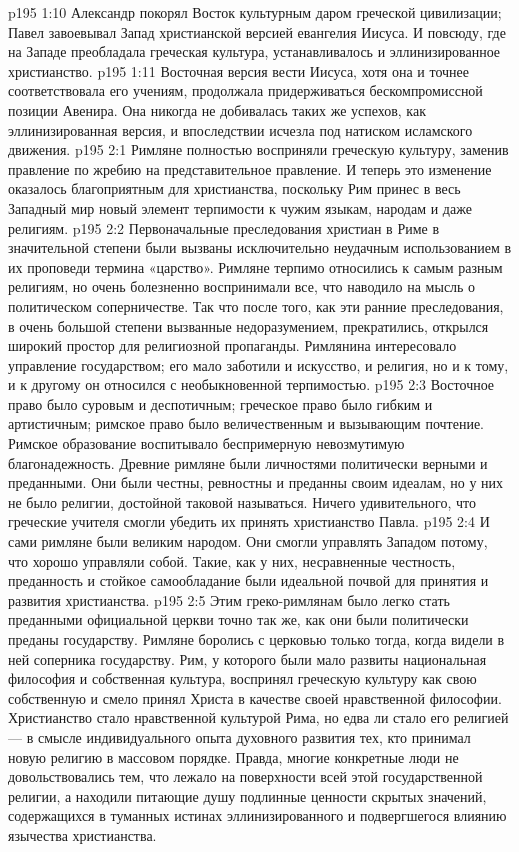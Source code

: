 \vs p195 1:10 Александр покорял Восток культурным даром греческой цивилизации; Павел завоевывал Запад христианской версией евангелия Иисуса. И повсюду, где на Западе преобладала греческая культура, устанавливалось и эллинизированное христианство.
\vs p195 1:11 \pc Восточная версия вести Иисуса, хотя она и точнее соответствовала его учениям, продолжала придерживаться бескомпромиссной позиции Авенира. Она никогда не добивалась таких же успехов, как эллинизированная версия, и впоследствии исчезла под натиском исламского движения.
\vs p195 2:1 Римляне полностью восприняли греческую культуру, заменив правление по жребию на представительное правление. И теперь это изменение оказалось благоприятным для христианства, поскольку Рим принес в весь Западный мир новый элемент терпимости к чужим языкам, народам и даже религиям.
\vs p195 2:2 Первоначальные преследования христиан в Риме в значительной степени были вызваны исключительно неудачным использованием в их проповеди термина «царство». Римляне терпимо относились к самым разным религиям, но очень болезненно воспринимали все, что наводило на мысль о политическом соперничестве. Так что после того, как эти ранние преследования, в очень большой степени вызванные недоразумением, прекратились, открылся широкий простор для религиозной пропаганды. Римлянина интересовало управление государством; его мало заботили и искусство, и религия, но и к тому, и к другому он относился с необыкновенной терпимостью.
\vs p195 2:3 Восточное право было суровым и деспотичным; греческое право было гибким и артистичным; римское право было величественным и вызывающим почтение. Римское образование воспитывало беспримерную невозмутимую благонадежность. Древние римляне были личностями политически верными и преданными. Они были честны, ревностны и преданны своим идеалам, но у них не было религии, достойной таковой называться. Ничего удивительного, что греческие учителя смогли убедить их принять христианство Павла.
\vs p195 2:4 И сами римляне были великим народом. Они смогли управлять Западом потому, что хорошо управляли собой. Такие, как у них, несравненные честность, преданность и стойкое самообладание были идеальной почвой для принятия и развития христианства.
\vs p195 2:5 Этим греко\hyp{}римлянам было легко стать преданными официальной церкви точно так же, как они были политически преданы государству. Римляне боролись с церковью только тогда, когда видели в ней соперника государству. Рим, у которого были мало развиты национальная философия и собственная культура, воспринял греческую культуру как свою собственную и смело принял Христа в качестве своей нравственной философии. Христианство стало нравственной культурой Рима, но едва ли стало его религией --- в смысле индивидуального опыта духовного развития тех, кто принимал новую религию в массовом порядке. Правда, многие конкретные люди не довольствовались тем, что лежало на поверхности всей этой государственной религии, а находили питающие душу подлинные ценности скрытых значений, содержащихся в туманных истинах эллинизированного и подвергшегося влиянию язычества христианства.

